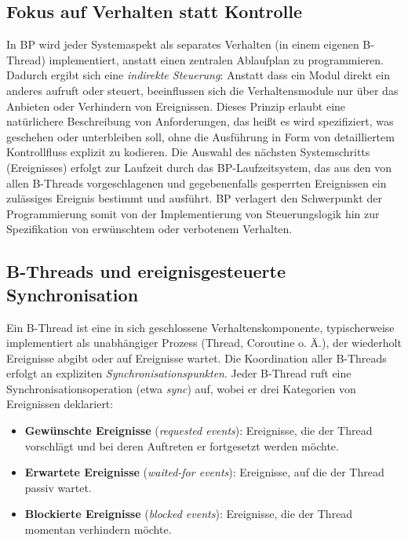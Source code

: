 \subsection{Fokus auf Verhalten statt Kontrolle}\label{subsec:fokus-auf-verhalten-statt-kontrolle}
In BP wird jeder Systemaspekt als separates Verhalten (in einem eigenen B-Thread) implementiert, anstatt einen zentralen Ablaufplan zu programmieren.
Dadurch ergibt sich eine \emph{indirekte Steuerung}: Anstatt dass ein Modul direkt ein anderes aufruft oder steuert, beeinflussen sich die Verhaltensmodule nur über das Anbieten oder Verhindern von Ereignissen\cite{Harel2012}.
Dieses Prinzip erlaubt eine natürlichere Beschreibung von Anforderungen, das heißt es wird spezifiziert, was geschehen oder unterbleiben soll, ohne die Ausführung in Form von detailliertem Kontrollfluss explizit zu kodieren\cite{Harel2012}.
Die Auswahl des nächsten Systemschritts (Ereignisses) erfolgt zur Laufzeit durch das BP-Laufzeitsystem, das aus den von allen B-Threads vorgeschlagenen und gegebenenfalls gesperrten Ereignissen ein zulässiges Ereignis bestimmt und ausführt\cite{Harel2012}.
BP verlagert den Schwerpunkt der Programmierung somit von der Implementierung von Steuerungslogik hin zur Spezifikation von erwünschtem oder verbotenem Verhalten.

\subsection{B-Threads und ereignisgesteuerte Synchronisation}\label{subsec:b-threads-und-ereignisgesteuerte-synchronisation}
Ein B-Thread ist eine in sich geschlossene Verhaltenskomponente, typischerweise implementiert als unabhängiger Prozess (Thread, Coroutine o. Ä.), der wiederholt Ereignisse abgibt oder auf Ereignisse wartet.
Die Koordination aller B-Threads erfolgt an expliziten \emph{Synchronisationspunkten}.
Jeder B-Thread ruft eine Synchronisationsoperation (etwa \emph{sync}) auf, wobei er drei Kategorien von Ereignissen deklariert\cite{Harel2010}:
\begin{itemize}
  \item \textbf{Gewünschte Ereignisse} (\emph{requested events}): Ereignisse, die der Thread vorschlägt und bei deren Auftreten er fortgesetzt werden möchte.
  \item \textbf{Erwartete Ereignisse} (\emph{waited-for events}): Ereignisse, auf die der Thread passiv wartet.
  \item \textbf{Blockierte Ereignisse} (\emph{blocked events}): Ereignisse, die der Thread momentan verhindern möchte.
\end{itemize}

